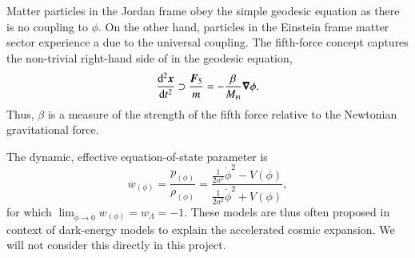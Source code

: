     Matter particles in the Jordan frame obey the simple geodesic equation as there is no coupling to $\phi$. On the other hand, particles in the Einstein frame matter sector experience a  due to the universal coupling. The fifth-force concept captures the non-trivial right-hand side of in the geodesic equation,
    \begin{equation}\label{eq:cosmo:quintessence:framework:fifth_force}
        \dv[2]{\ensuremath{\boldsymbol{x}}}{t} \supset \frac{\boldsymbol{F}_5}{m} = - \frac{\beta}{M_{\text{\tiny{Pl}}}} \boldsymbol{\nabla}\phi.
    \end{equation}
    Thus, 
    $\beta$ is 
    a measure of the strength of the fifth force relative to the Newtonian gravitational force.  



    The dynamic, effective equation-of-state parameter is 
    \begin{equation}
        w_{(\phi)} =  \frac{p_{(\phi)}}{\rho_{(\phi)}}= \frac{\frac{1}{2a^2} \dot{\phi}^2 - V(\phi) }{\frac{1}{2a^2} \dot{\phi}^2 + V(\phi)},
    \end{equation}
    for which $\lim_{\dot{\phi}\to 0}{w_{(\phi)}}=w_\Lambda = -1$. %
    These models are thus often proposed in context of dark-energy models to explain the accelerated cosmic expansion. We will not consider this directly in this project.





